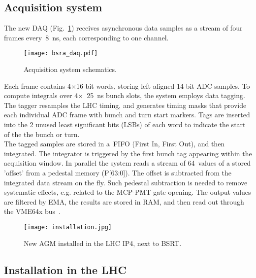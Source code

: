 \subsection{Acquisition system}
The new DAQ (Fig.~\ref{fig:bsra_daq}) receives asynchronous data samples as a stream of four frames every~\SI{8}{\nano s}, each corresponding to one channel.
%
\begin{figure}[!tbh]
    \centering
    \texttt{[image: bsra\_daq.pdf]}
    \caption{Acquisition system schematics.}
    \label{fig:bsra_daq}
\end{figure}
%
Each frame contains 4$\times$16-bit words, storing left-aligned 14-bit ADC samples. 
%
To compute integrals over 4$\times$~\SI{25}{\nano\second} bunch slots, the system employs data tagging. 
%
The tagger resamples the LHC timing, and generates timing masks that  provide each individual ADC frame with %
bunch and turn start markers. 
%
Tags are inserted into the  2 unused least significant bits (LSBs) of each word to indicate the start of the  the bunch or turn.
\\
%
The tagged samples are stored in a~FIFO (First In, First Out), and then integrated. 
%
The integrator is triggered %
by the first bunch tag appearing within the acquisition window.
%
In parallel the system reads a stream of 64~values of a stored 'offset' from a pedestal memory (P[63:0]).
%
The offset is subtracted  from the integrated data stream on the fly.
%
Such pedestal subtraction is needed to remove systematic effects, e.g. related to the  MCP-PMT gate opening. 
%
The output values are filtered by EMA, the results are stored  in RAM, and then read out through the VME64x bus~\cite{my_thesis}.

\begin{figure}[!tbh]
    \centering
    \texttt{[image: installation.jpg]}
    \caption{New AGM installed in the LHC IP4, next to BSRT.}
    \label{fig:installation}
\end{figure}

\subsection{Installation in the LHC}

